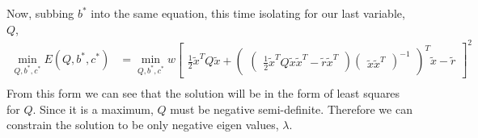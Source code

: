 Now, subbing $b^*$ into the same equation, this time isolating for our last variable, $Q$,
\begin{align*}
\underset{Q,b^*,c^*}{\operatorname{min}} E(Q,b^*,c^*) &=
\underset{Q,b^*,c^*}{\operatorname{min}} w \begin{bmatrix} \frac{1}{2}\tilde{x}^TQ\tilde{x} +\begin{pmatrix}\begin{pmatrix} \frac{1}{2}\tilde{x}^TQ\tilde{x}\tilde{x}^T - \tilde{r}\tilde{x}^T \end{pmatrix}\begin{pmatrix} \tilde{x}\tilde{x}^T \end{pmatrix}^{-1} \end{pmatrix}^T\tilde{x} - \tilde{r} \end{bmatrix}^2 \\
\end{align*}
From this form we can see that the solution will be in the form of least squares for $Q$. Since it is a maximum, $Q$ must be negative semi-definite. Therefore we can constrain the solution to be only negative eigen values, $\lambda$.